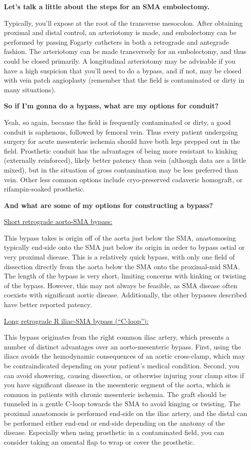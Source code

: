 \documentclass[
]{book}
\begin{document}
\textbf{Let's talk a little about the steps for an SMA embolectomy.}

Typically, you'll expose at the root of the transverse mesocolon. After
obtaining proximal and distal control, an arteriotomy is made, and
embolectomy can be performed by passing Fogarty catheters in both a
retrograde and antegrade fashion. The arteriotomy can be made
transversely for an embolectomy, and thus could be closed primarily. A
longitudinal arteriotomy may be advisable if you have a high suspicion
that you'll need to do a bypass, and if not, may be closed with vein
patch angioplasty (remember that the field is contaminated or dirty in
many situations).

\textbf{So if I'm gonna do a bypass, what are my options for conduit?}

Yeah, so again, because the field is frequently contaminated or dirty, a
good conduit is saphenous, followed by femoral vein. Thus every patient
undergoing surgery for acute mesenteric ischemia should have both legs
prepped out in the field. Prosthetic conduit has the advantages of being
more resistant to kinking (externally reinforced), likely better patency
than vein (although data are a little mixed), but in the situation of
gross contamination may be less preferred than vein. Other less common
options include cryo-preserved cadaveric homograft, or rifampin-soaked
prosthetic.

\textbf{And what are some of my options for constructing a bypass?}

\underline{Short retrograde aorto-SMA bypass:}

This bypass takes is origin off of the aorta just below the SMA,
anastomosing typically end-side onto the SMA just below its origin in
order to bypass ostial or very proximal disease. This is a relatively
quick bypass, with only one field of dissection directly from the aorta
below the SMA onto the proximal-mid SMA. The length of the bypass is
very short, limiting concerns with kinking or twisting of the bypass.
However, this may not always be feasible, as SMA disease often coexists
with significant aortic disease. Additionally, the other bypasses
described have better reported patency.

\underline{Long retrograde R iliac-SMA bypass (``C-loop''):}

This bypass originates from the right common iliac artery, which
presents a number of distinct advantages over an aorto-mesenteric
bypass. First, using the iliacs avoids the hemodynamic consequences of
an aortic cross-clamp, which may be contraindicated depending on your
patient's medical condition. Second, you can avoid showering, causing
dissection, or otherwise injuring your clamp sites if you have
significant disease in the mesenteric segment of the aorta, which is
common in patients with chronic mesenteric ischemia. The graft should be
tunneled in a gentle C-loop towards the SMA to avoid kinging or
twisting. The proximal anastomosis is performed end-side on the iliac
artery, and the distal can be performed either end-end or end-side
depending on the anatomy of the disease. Especially when using
prosthetic in a contaminated field, you can consider taking an omental
flap to wrap or cover the prosthetic.
\end{document}
